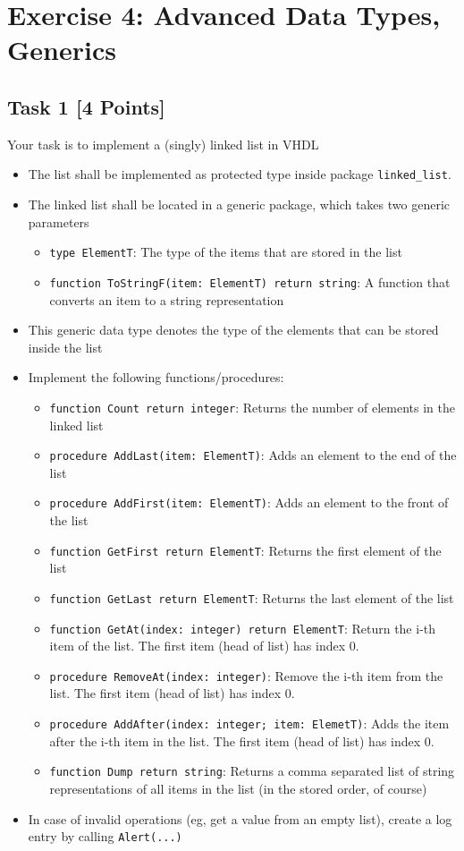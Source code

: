\documentclass[12pt,epsf,makeidx,oneside]{book}
\begin{document}
\section{Exercise 4: Advanced Data Types, Generics}
  \subsection{Task 1 [4 Points]}
  Your task is to implement a (singly) linked list in VHDL
  \begin{itemize}[noitemsep]
    \item The list shall be implemented as protected type inside package {\tt linked\_list}.
    \item The linked list shall be located in a generic package, which takes two generic parameters
    \begin{itemize}[noitemsep]
      \item {\tt type ElementT}: The type of the items that are stored in the list
      \item {\tt function ToStringF(item: ElementT) return string}: A function that converts an item to a string representation
    \end{itemize}
    \item This generic data type denotes the type of the elements that can be stored inside the list
    \item Implement the following functions/procedures:
    \begin{itemize}[noitemsep]
      \item {\tt function Count return integer}: Returns the number of elements in the linked list
      \item {\tt procedure AddLast(item: ElementT)}: Adds an element to the end of the list
      \item {\tt procedure AddFirst(item: ElementT)}: Adds an element to the front of the list
      \item {\tt function GetFirst return ElementT}: Returns the first element of the list
      \item {\tt function GetLast return ElementT}: Returns the last element of the list
      \item {\tt function GetAt(index: integer) return ElementT}: Return the i-th item of the list. The first item (head of list) has index 0.
      \item {\tt procedure RemoveAt(index: integer)}: Remove the i-th item from the list. The first item (head of list) has index 0.
      \item {\tt procedure AddAfter(index: integer; item: ElemetT)}: Adds the item after the i-th item in the list. The first item (head of list) has index 0.
      \item {\tt function Dump return string}: Returns a comma separated list of string representations of all items in the list (in the stored order, of course)
    \end{itemize}
    \item In case of invalid operations (eg, get a value from an empty list), create a log entry by calling {\tt Alert(...)}
  \end{itemize}
\end{document}
